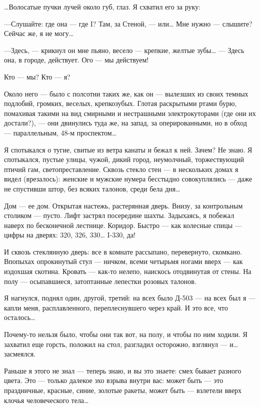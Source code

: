 \documentclass[11pt,openany]{book}
\begin{document}
\ldots{}Волосатые пучки лучей около губ, глаз. Я схватил его за руку:

---Слушайте: где она --- где I? Там, за Стеной, --- или\ldots{} Мне нужно --- слышите? Сейчас же, я не могу\ldots{}

---Здесь, --- крикнул он мне пьяно, весело --- крепкие, желтые зубы\ldots{} --- Здесь она, в городе, действует. Ого --- мы действуем!

Кто --- мы? Кто --- я?

Около него --- было с полсотни таких же, как он --- вылезших из своих темных подлобий, громких, веселых, крепкозубых. Глотая раскрытыми ртами бурю, помахивая такими на вид смирными и нестрашными электрокуторами (где они их достали?), --- они двинулись туда же, на запад, за оперированными, но в обход --- параллельным, 48-м проспектом\ldots{}

Я спотыкался о тугие, свитые из ветра канаты и бежал к ней. Зачем? Не знаю. Я спотыкался, пустые улицы, чужой, дикий город, неумолчный, торжествующий птичий гам, светопреставление. Сквозь стекло стен --- в нескольких домах я видел (врезалось): женские и мужские нумера бесстыдно совокуплялись --- даже не спустивши штор, без всяких талонов, среди бела дня\ldots{}

Дом --- ее дом. Открытая настежь, растерянная дверь. Внизу, за контрольным столиком --- пусто. Лифт застрял посередине шахты. Задыхаясь, я побежал наверх по бесконечной лестнице. Коридор. Быстро --- как колесные спицы --- цифры на дверях: 320, 326, 330\ldots{} I-330, да!

И сквозь стеклянную дверь: все в комнате рассыпано, перевернуто, скомкано. Впопыхах опрокинутый стул --- ничком, всеми четырьмя ногами вверх --- как издохшая скотина. Кровать --- как-то нелепо, наискось отодвинутая от стены. На полу --- осыпавшиеся, затоптанные лепестки розовых талонов.

Я нагнулся, поднял один, другой, третий: на всех было Д-503 --- на всех был я --- капли меня, расплавленного, переплеснувшего через край. И это все, что осталось\ldots{}

Почему-то нельзя было, чтобы они так вот, на полу, и чтобы по ним ходили. Я захватил еще горсть, положил на стол, разгладил осторожно, взглянул --- и\ldots{} засмеялся.

Раньше я этого не знал --- теперь знаю, и вы это знаете: смех бывает разного цвета. Это --- только далекое эхо взрыва внутри вас: может быть --- это праздничные, красные, синие, золотые ракеты, может быть --- взлетели вверх клочья человеческого тела\ldots{}
\end{document}
